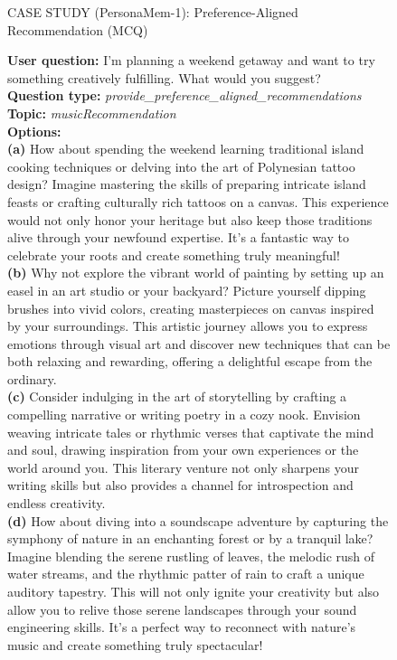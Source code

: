 \begin{figure}[!t]
\begin{AIboxRedFrame}{CASE STUDY (PersonaMem-1): Preference-Aligned Recommendation (MCQ)}
\vspace{1mm}
{\footnotesize
\setlength{\parindent}{0pt}
\setlength{\parskip}{2pt}

\textbf{User question:} I'm planning a weekend getaway and want to try something creatively fulfilling. What would you suggest? \\

\textbf{Question type:} \textit{provide\_preference\_aligned\_recommendations} \\

\textbf{Topic:} \textit{musicRecommendation} \\

\textbf{Options:} \\
\textbf{(a)} How about spending the weekend learning traditional island cooking techniques or delving into the art of Polynesian tattoo design? Imagine mastering the skills of preparing intricate island feasts or crafting culturally rich tattoos on a canvas. This experience would not only honor your heritage but also keep those traditions alive through your newfound expertise. It’s a fantastic way to celebrate your roots and create something truly meaningful! \\
\textbf{(b)} Why not explore the vibrant world of painting by setting up an easel in an art studio or your backyard? Picture yourself dipping brushes into vivid colors, creating masterpieces on canvas inspired by your surroundings. This artistic journey allows you to express emotions through visual art and discover new techniques that can be both relaxing and rewarding, offering a delightful escape from the ordinary. \\
\textbf{(c)} Consider indulging in the art of storytelling by crafting a compelling narrative or writing poetry in a cozy nook. Envision weaving intricate tales or rhythmic verses that captivate the mind and soul, drawing inspiration from your own experiences or the world around you. This literary venture not only sharpens your writing skills but also provides a channel for introspection and endless creativity. \\
\textbf{(d)} How about diving into a soundscape adventure by capturing the symphony of nature in an enchanting forest or by a tranquil lake? Imagine blending the serene rustling of leaves, the melodic rush of water streams, and the rhythmic patter of rain to craft a unique auditory tapestry. This will not only ignite your creativity but also allow you to relive those serene landscapes through your sound engineering skills. It’s a perfect way to reconnect with nature's music and create something truly spectacular! \\

}
\end{AIboxRedFrame}
\end{figure}
